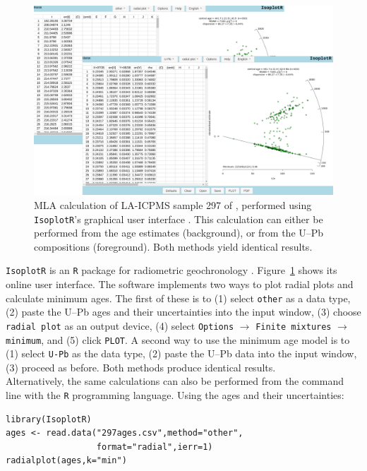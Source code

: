 \documentclass{article}
\begin{document}
\begin{figure}[!ht]
  \includegraphics[width=\textwidth]{IsoplotR.png}
  \caption{MLA calculation of LA-ICPMS sample 297 of
    \citet{gehrels2020}, performed using \texttt{IsoplotR}'s graphical
    user interface \citep{vermeesch2018b}. This calculation can either
    be performed from the age estimates (background), or from the
    U--Pb compositions (foreground). Both methods yield identical
    results. }
  \label{fig:IsoplotR}
\end{figure}

\texttt{IsoplotR} is an \texttt{R} package for radiometric
geochronology \citep{vermeesch2018c}. Figure~\ref{fig:IsoplotR} shows
its online user interface. The software implements two ways to plot
radial plots and calculate minimum ages. The first of these is to (1)
select \texttt{other} as a data type, (2) paste the U--Pb ages and
their uncertainties into the input window, (3) choose \texttt{radial
  plot} as an output device, (4) select \texttt{Options} $\rightarrow$
\texttt{Finite mixtures} $\rightarrow$ \texttt{minimum}, and (5) click
\texttt{PLOT}. A second way to use the minimum age model is to (1)
select \texttt{U-Pb} as the data type, (2) paste the U--Pb data into
the input window, (3) proceed as before. Both methods produce
identical results.\\

Alternatively, the same calculations can also be performed from the
command line with the \texttt{R} programming language. Using the ages
and their uncertainties:

\begin{verbatim}
library(IsoplotR)
ages <- read.data("297ages.csv",method="other",
                  format="radial",ierr=1)
radialplot(ages,k="min")
\end{verbatim}
\end{document}
